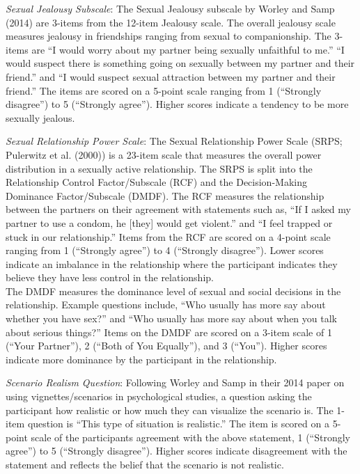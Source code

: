 \documentclass[
  english,
  a4paper]{apa7}
\begin{document}
\emph{Sexual Jealousy Subscale}:
The Sexual Jealousy subscale by Worley and Samp (2014) are 3-items from the 12-item Jealousy scale. The overall jealousy scale measures jealousy in friendships ranging from sexual to companionship. The 3-items are ``I would worry about my partner being sexually unfaithful to me.'' ``I would suspect there is something going on sexually between my partner and their friend.'' and ``I would suspect sexual attraction between my partner and their friend.'' The items are scored on a 5-point scale ranging from 1 (``Strongly disagree'') to 5 (``Strongly agree''). Higher scores indicate a tendency to be more sexually jealous.

\emph{Sexual Relationship Power Scale}:
The Sexual Relationship Power Scale (SRPS; Pulerwitz et al. (2000)) is a 23-item scale that measures the overall power distribution in a sexually active relationship. The SRPS is split into the Relationship Control Factor/Subscale (RCF) and the Decision-Making Dominance Factor/Subscale (DMDF). The RCF measures the relationship between the partners on their agreement with statements such as, ``If I asked my partner to use a condom, he {[}they{]} would get violent.'' and ``I feel trapped or stuck in our relationship.'' Items from the RCF are scored on a 4-point scale ranging from 1 (``Strongly agree'') to 4 (``Strongly disagree''). Lower scores indicate an imbalance in the relationship where the participant indicates they believe they have less control in the relationship.\\
The DMDF measures the dominance level of sexual and social decisions in the relationship. Example questions include, ``Who usually has more say about whether you have sex?'' and ``Who usually has more say about when you talk about serious things?'' Items on the DMDF are scored on a 3-item scale of 1 (``Your Partner''), 2 (``Both of You Equally''), and 3 (``You''). Higher scores indicate more dominance by the participant in the relationship.

\emph{Scenario Realism Question}:
Following Worley and Samp in their 2014 paper on using vignettes/scenarios in psychological studies, a question asking the participant how realistic or how much they can visualize the scenario is. The 1-item question is ``This type of situation is realistic.'' The item is scored on a 5-point scale of the participants agreement with the above statement, 1 (``Strongly agree'') to 5 (``Strongly disagree''). Higher scores indicate disagreement with the statement and reflects the belief that the scenario is not realistic.
\end{document}
